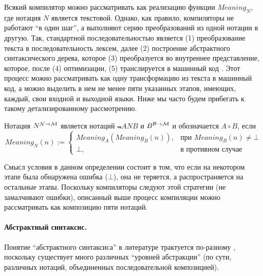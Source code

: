 {Всякий компилятор можно рассматривать как реализацию функции $Meaning_N$, где нотация $N$ является текстовой. Однако, как правило, компиляторы не работают ``в один шаг'', а выполняют серию преобразований из одной нотации в другую. Так, стандартной последовательностью является (1) преобразование текста в последовательность лексем, далее (2) построение абстрактного синтаксического дерева, которое (3) преобразуется во внутреннее представление, которое, после (4) оптимизации, (5) транслируется в машинный код \cite{Dragon}. Этот процесс можно рассматривать как одну трансформацию из текста в машинный код, а можно выделить в нем не менее пяти указанных этапов, имеющих, каждый, свои входной и выходной языки. Ниже мы часто будем прибегать к такому детализированному рассмотрению.
\newcommand{\Comp}[2]{#1 \circ #2}
\begin{Def}
Нотация $N^{{\mathcal{N}} \rightarrow{} {\mathcal{M}}}$ является  нотаций $\Not{A}{N}{B}$ и $B^{{\mathcal{B}} \rightarrow{} {\mathcal{M}}}$ и обозначается $\Comp{A}{B}$, если 
	$$Meaning_N(n) := \left\{\begin{array}{ll}
		Meaning_{A}(Meaning_{B}(n)), & \mbox{при } Meaning_{B}(n) \neq \bot\\
		\bot, & \mbox{в противном случае}
	\end{array}\right.$$
\end{Def}

Смысл условия в данном определении состоит в том, что если на некотором этапе была обнаружена ошибка ($\bot$), она не теряется, а распространяется на остальные этапы. Поскольку компиляторы следуют этой стратегии (не замалчивают ошибки), описанный выше процесс компиляции можно рассматривать как композицию пяти нотаций.


\paragraph*{Абстрактный синтаксис. } Понятие ``абстрактного синтаксиса'' в литературе трактуется по-разному \cite{Dragon ...}, поскольку существует много различных ``уровней абстракции'' (по сути, различных нотаций, объединенных последовательной композицией).

}
